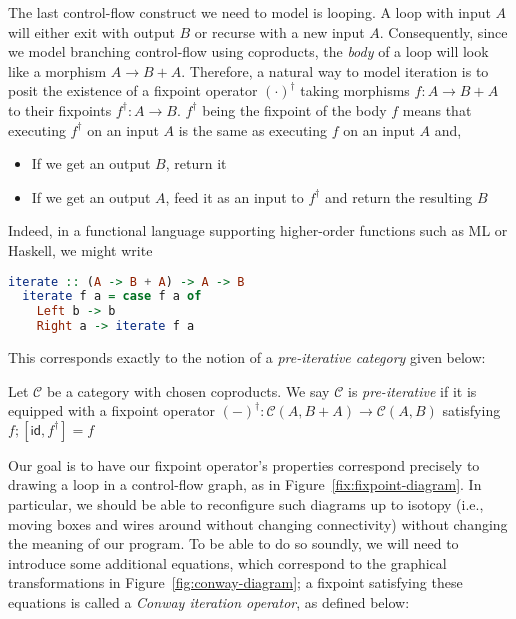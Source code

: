 \documentclass[acmsmall,screen,review]{acmart}
\newcommand{\mc}[1]{\ensuremath{\mathcal{#1}}}
\newcommand{\ms}[1]{\ensuremath{\mathsf{#1}}}
\begin{document}
The last control-flow construct we need to model is looping. A loop with input $A$ will either exit
with output $B$ or recurse with a new input $A$. Consequently, since we model branching control-flow
using coproducts, the \emph{body} of a loop will look like a morphism $A \to B + A$. Therefore, a
natural way to model iteration is to posit the existence of a fixpoint operator $(\cdot)^\dagger$
taking morphisms $f: A \to B + A$ to their fixpoints $f^\dagger: A \to B$. $f^\dagger$ being the
fixpoint of the body $f$ means that executing $f^\dagger$ on an input $A$ is the same as executing
$f$ on an input $A$ and,
\begin{itemize}
  \item If we get an output $B$, return it
  \item If we get an output $A$, feed it as an input to $f^\dagger$ and return the resulting $B$
\end{itemize}
Indeed, in a functional language supporting higher-order functions such as ML or Haskell, we might
write 
\begin{lstlisting}[language=Haskell]
  iterate :: (A -> B + A) -> A -> B
  iterate f a = case f a of
    Left b -> b
    Right a -> iterate f a
\end{lstlisting}
This corresponds exactly to the notion of a \emph{pre-iterative category} given below:
\begin{definition}
  Let $\mc{C}$ be a category with chosen coproducts. We say $\mc{C}$ is \emph{pre-iterative} if it
  is equipped with a fixpoint operator $(-)^\dagger : \mc{C}(A, B + A) \to \mc{C}(A, B)$ satisfying
  $f ; [\ms{id}, f^\dagger] = f$
\end{definition}
Our goal is to have our fixpoint operator's properties correspond precisely to drawing a loop in a
control-flow graph, as in Figure~\ref{fix:fixpoint-diagram}. In particular, we should be able to
reconfigure such diagrams up to isotopy (i.e., moving boxes and wires around without changing
connectivity) without changing the meaning of our program. To be able to do so soundly, we will need
to introduce some additional equations, which correspond to the graphical transformations in
Figure~\ref{fig:conway-diagram}; a fixpoint satisfying these equations is called a \emph{Conway
iteration operator}, as defined below:
\end{document}
